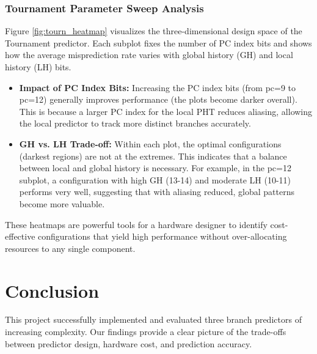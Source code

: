 \documentclass[sigconf, screen]{acmart}
\begin{document}
\subsubsection{Tournament Parameter Sweep Analysis}
Figure \ref{fig:tourn_heatmap} visualizes the three-dimensional design space of the Tournament predictor. Each subplot fixes the number of PC index bits and shows how the average misprediction rate varies with global history (GH) and local history (LH) bits.
\begin{itemize}
    \item \textbf{Impact of PC Index Bits:} Increasing the PC index bits (from pc=9 to pc=12) generally improves performance (the plots become darker overall). This is because a larger PC index for the local PHT reduces aliasing, allowing the local predictor to track more distinct branches accurately.
    \item \textbf{GH vs. LH Trade-off:} Within each plot, the optimal configurations (darkest regions) are not at the extremes. This indicates that a balance between local and global history is necessary. For example, in the pc=12 subplot, a configuration with high GH (13-14) and moderate LH (10-11) performs very well, suggesting that with aliasing reduced, global patterns become more valuable.
\end{itemize}
These heatmaps are powerful tools for a hardware designer to identify cost-effective configurations that yield high performance without over-allocating resources to any single component.

\section{Conclusion}

This project successfully implemented and evaluated three branch predictors of increasing complexity. Our findings provide a clear picture of the trade-offs between predictor design, hardware cost, and prediction accuracy.
\end{document}
